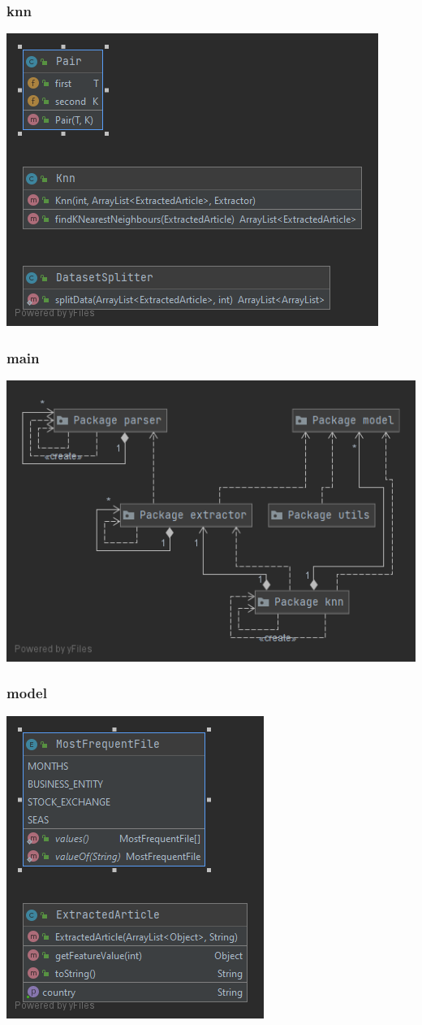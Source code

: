 \documentclass{classrep}
\begin{document}
\subsubsection{knn}
\includegraphics[scale=0.5]{Package knn}
\subsubsection{main}
\includegraphics[scale=0.5]{Package main}
\subsubsection{model}
\includegraphics[scale=0.5]{Package model}
\end{document}
